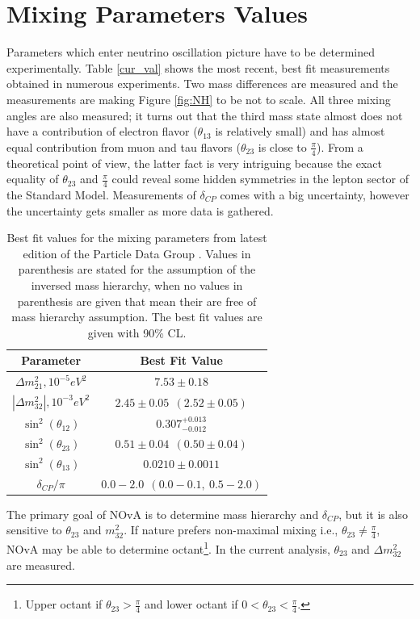 \section{Mixing Parameters Values} \label{osc_param}
Parameters which enter neutrino oscillation picture have to be determined experimentally. Table \ref{cur_val}
shows the most recent, best fit measurements obtained in numerous experiments. Two mass differences are 
measured and the measurements are making Figure \ref{fig:NH} to be not to scale. All three mixing angles
are also measured; it turns out that the third mass state almost does not have a contribution of electron 
flavor ($\theta_{13}$ is relatively small) and has almost equal contribution from muon and tau flavors
($\theta_{23}$ is close to $\frac{\pi}{4}$). From a theoretical point of view, the latter fact is very 
intriguing because the exact equality of $\theta_{23}$ and $\frac{\pi}{4}$ could reveal some hidden symmetries 
in the lepton sector of the Standard Model. Measurements of $\delta_{CP}$ comes with a big uncertainty, 
however the uncertainty gets smaller as more data is gathered.
\begin{table}
\begin{center}
  \renewcommand{\arraystretch}{1.4}
  \begin{tabular}{| c | c |}
    \hline
    \textbf{Parameter}                & \textbf{Best Fit Value} \\ \hline \hline
    $\Delta  m_{21}^2,  10^{-5} eV^2$ & $7.53\pm 0.18$  \\ \hline
    $|\Delta m_{32}^2|, 10^{-3} eV^2$ & $2.45\pm 0.05~~(2.52\pm 0.05)$ \\ \hline
    $\sin^2(\theta_{12})$             & $0.307^{+0.013}_{-0.012}$ \\ \hline
    $\sin^2(\theta_{23})$             & $0.51\pm 0.04~~ (0.50\pm 0.04)$ \\ \hline
    $\sin^2(\theta_{13})$             & $0.0210\pm 0.0011$ \\ \hline
    $\delta_{CP}/\pi$                 & $0.0-2.0~~(0.0-0.1,~ 0.5-2.0)$  \\
    \hline
  \end{tabular}
\caption{Best fit values for the mixing parameters from latest edition of the Particle Data Group \cite{rpf}. 
Values in parenthesis are stated for the assumption of the inversed mass hierarchy, when no values in parenthesis 
are given that mean their are free of mass hierarchy assumption. The best fit values are given with 90\% CL.} 
\end{center}
\end{table}

The primary goal of NOvA is to determine mass hierarchy and $\delta_{CP}$, but it is also sensitive to $\theta_{23}$ and
$m_{32}^2$. If nature prefers non-maximal mixing i.e., $\theta_{23} 
\neq \frac{\pi}{4}$, NOvA may be able to determine octant\footnote{Upper octant if $\theta_{23} > \frac{\pi}{4}$
and lower octant if $0 < \theta_{23} < \frac{\pi}{4}$.}. In the current analysis, $\theta_{23}$ and 
$\Delta m_{32}^2$ are measured. 

